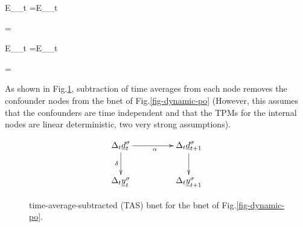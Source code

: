 \beq
E_\s{}_t
=\delta E_\s{}_t
\eeq

\beq
\delta=
\eeq

\beq
E_\s{}_t
=\alp E_\s{}_t
\eeq

\beq
\alp=
\eeq

As shown in Fig.\ref{fig-dynamic-po-avg},
 subtraction 
of time averages 
from each node removes the 
confounder nodes from the bnet
of Fig.\ref{fig-dynamic-po} (However, this
assumes that the
confounders are time independent
and that the TPMs 
for the internal nodes
are linear deterministic,
two very strong assumptions). 

\begin{figure}[h!]
$$\xymatrix @C=4pc {
\Delta_t\rvd^\s_{t}\ar[d]_\delta\ar[r]_\alp
&\Delta_t\rvd^\s_{t+1}\ar[d]
\\
\Delta_t\rvy^\s_t
&\Delta_t\rvy^\s_{t+1}
}$$
\caption{time-average-subtracted (TAS) bnet for the bnet 
of Fig.\ref{fig-dynamic-po}.
}
\label{fig-dynamic-po-avg}
\end{figure}
